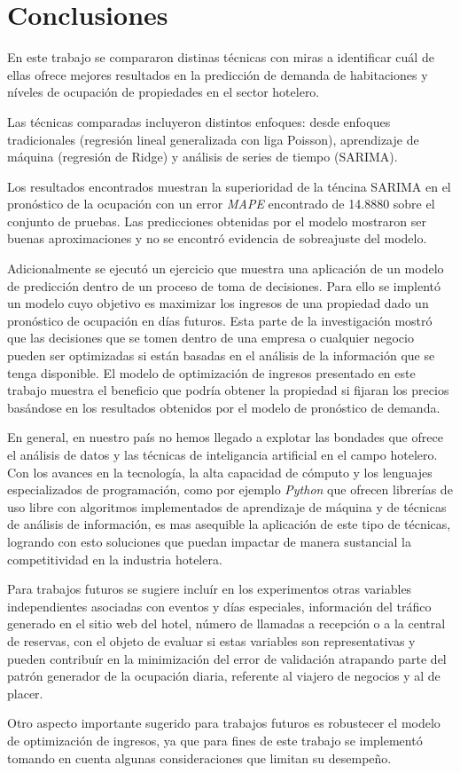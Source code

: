 \chapter{Conclusiones}
\label{ch:conclusiones}

En este trabajo se compararon distinas técnicas con miras a identificar cuál de ellas ofrece mejores resultados en la predicción de demanda de habitaciones y níveles de ocupación de propiedades en el sector hotelero.

Las técnicas comparadas incluyeron distintos enfoques: desde enfoques tradicionales (regresión lineal generalizada con liga Poisson), aprendizaje de máquina (regresión de Ridge) y análisis de series de tiempo (SARIMA). 

Los resultados encontrados muestran la superioridad de la téncina SARIMA en el pronóstico de la ocupación con un error \emph{MAPE} encontrado de 14.8880 sobre el conjunto de pruebas. Las predicciones obtenidas por el modelo mostraron ser buenas aproximaciones y no se encontró evidencia de sobreajuste del modelo.

Adicionalmente se ejecutó un ejercicio que muestra una aplicación de un modelo de predicción dentro de un proceso de toma de decisiones. Para ello se implentó un modelo cuyo objetivo es maximizar los ingresos de una propiedad dado un pronóstico de ocupación en días futuros. Esta parte de la investigación mostró que las decisiones que se tomen dentro de una empresa o cualquier negocio pueden ser optimizadas si están basadas en el análisis de la información que se tenga disponible. El modelo de optimización de ingresos presentado en este trabajo muestra el beneficio que podría obtener la propiedad si fijaran los precios basándose en los resultados obtenidos por el modelo de pronóstico de demanda.

En general, en nuestro país no hemos llegado a explotar las bondades que ofrece el análisis de datos y las técnicas de inteligancia artificial en el campo hotelero. Con los avances en la tecnología, la alta capacidad de cómputo y los lenguajes especializados de programación, como por ejemplo \emph{Python} que ofrecen librerías de uso libre con algoritmos implementados de aprendizaje de máquina y de técnicas de análisis de información, es mas asequible la aplicación de este tipo de técnicas, logrando con esto soluciones que puedan impactar de manera sustancial la competitividad en la industria hotelera.

Para trabajos futuros se sugiere incluír en los experimentos otras variables independientes asociadas con eventos y días especiales, información del tráfico generado en el sitio web del hotel, número de llamadas a recepción o a la central de reservas, con el objeto de evaluar si estas variables son representativas y pueden contribuír en la minimización del error de validación atrapando parte del patrón generador de la ocupación diaria, referente al viajero de negocios y al de placer.

Otro aspecto importante sugerido para trabajos futuros es robustecer el modelo de optimización de ingresos, ya que para fines de este trabajo se implementó tomando en cuenta algunas consideraciones que limitan su desempeño.


